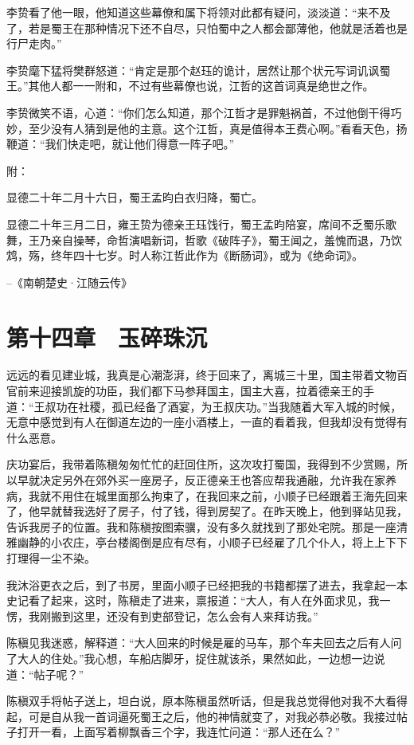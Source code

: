 李贽看了他一眼，他知道这些幕僚和属下将领对此都有疑问，淡淡道：“来不及了，若是蜀王在那种情况下还不自尽，只怕蜀中之人都会鄙薄他，他就是活着也是行尸走肉。”

李贽麾下猛将樊群怒道：“肯定是那个赵珏的诡计，居然让那个状元写词讥讽蜀王。”其他人都一一附和，不过有些幕僚也说，江哲的这首词真是绝世之作。

李贽微笑不语，心道：“你们怎么知道，那个江哲才是罪魁祸首，不过他倒干得巧妙，至少没有人猜到是他的主意。这个江哲，真是值得本王费心啊。”看看天色，扬鞭道：“我们快走吧，就让他们得意一阵子吧。”

附：

显德二十年二月十六日，蜀王孟昀白衣归降，蜀亡。

显德二十年三月二日，雍王贽为德亲王珏饯行，蜀王孟昀陪宴，席间不乏蜀乐歌舞，王乃亲自操琴，命哲演唱新词，哲歌《破阵子》，蜀王闻之，羞愧而退，乃饮鸩，殇，终年四十七岁。时人称江哲此作为《断肠词》，或为《绝命词》。

--《南朝楚史·江随云传》

\chapter{第十四章　玉碎珠沉}

远远的看见建业城，我真是心潮澎湃，终于回来了，离城三十里，国主带着文物百官前来迎接凯旋的功臣，我们都下马参拜国主，国主大喜，拉着德亲王的手道：“王叔功在社稷，孤已经备了酒宴，为王叔庆功。”当我随着大军入城的时候，无意中感觉到有人在御道左边的一座小酒楼上，一直的看着我，但我却没有觉得有什么恶意。

庆功宴后，我带着陈稹匆匆忙忙的赶回住所，这次攻打蜀国，我得到不少赏赐，所以早就决定另外在郊外买一座房子，反正德亲王也答应帮我通融，允许我在家养病，我就不用住在城里面那么拘束了，在我回来之前，小顺子已经跟着王海先回来了，他早就替我选好了房子，付了钱，得到房契了。在昨天晚上，他到驿站见我，告诉我房子的位置。我和陈稹按图索骥，没有多久就找到了那处宅院。那是一座清雅幽静的小农庄，亭台楼阁倒是应有尽有，小顺子已经雇了几个仆人，将上上下下打理得一尘不染。

我沐浴更衣之后，到了书房，里面小顺子已经把我的书籍都摆了进去，我拿起一本史记看了起来，这时，陈稹走了进来，禀报道：“大人，有人在外面求见，我一愣，我刚搬到这里，还没有到吏部登记，怎么会有人来拜访我。”

陈稹见我迷惑，解释道：“大人回来的时候是雇的马车，那个车夫回去之后有人问了大人的住处。”我心想，车船店脚牙，捉住就该杀，果然如此，一边想一边说道：“帖子呢？”

陈稹双手将帖子送上，坦白说，原本陈稹虽然听话，但是我总觉得他对我不大看得起，可是自从我一首词逼死蜀王之后，他的神情就变了，对我必恭必敬。我接过帖子打开一看，上面写着柳飘香三个字，我连忙问道：“那人还在么？”

